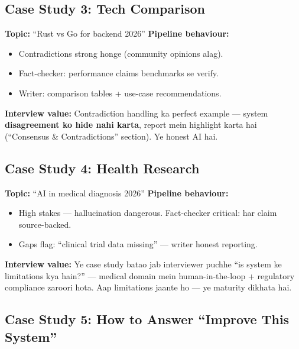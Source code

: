 \subsection{Case Study 3: Tech Comparison}

\begin{conceptbox}
\textbf{Topic:} ``Rust vs Go for backend 2026'' \textbf{Pipeline behaviour:}
\begin{itemize}
\item Contradictions strong honge (community opinions alag).
\item Fact-checker: performance claims benchmarks se verify.
\item Writer: comparison tables + use-case recommendations.
\end{itemize}
\textbf{Interview value:} Contradiction handling ka perfect example --- system \textbf{disagreement ko hide nahi karta}, report mein highlight karta hai (``Consensus \& Contradictions'' section). Ye honest AI hai.
\end{conceptbox}

\subsection{Case Study 4: Health Research}

\begin{conceptbox}
\textbf{Topic:} ``AI in medical diagnosis 2026'' \textbf{Pipeline behaviour:}
\begin{itemize}
\item High stakes --- hallucination dangerous. Fact-checker critical: har claim source-backed.
\item Gaps flag: ``clinical trial data missing'' --- writer honest reporting.
\end{itemize}
\textbf{Interview value:} Ye case study batao jab interviewer puchhe ``is system ke limitations kya hain?'' --- medical domain mein human-in-the-loop + regulatory compliance zaroori hota. Aap limitations jaante ho --- ye maturity dikhata hai.
\end{conceptbox}

\subsection{Case Study 5: How to Answer ``Improve This System''}

